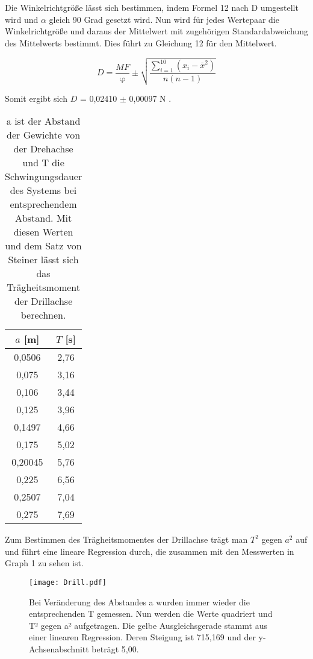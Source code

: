 \documentclass[titlepage = firstcover]{scrartcl}
\begin{document}
      Die Winkelrichtgröße lässt sich bestimmen, indem Formel 12 nach D umgestellt wird und $\alpha$ gleich 90 Grad gesetzt wird. Nun wird für jedes Wertepaar die
      Winkelrichtgröße und daraus der Mittelwert mit zugehörigen Standardabweichung des Mittelwerts bestimmt. Dies führt zu Gleichung 12 für den Mittelwert.

      \begin{equation}
        D = \frac{MF}{\upvarphi} \pm \sqrt{\frac{\sum_{i=1}^{10}(x_i - \overline{x}^2)}{n(n-1)}}   
      \end{equation}

      Somit ergibt sich $D$ = 0,02410 $\pm$ 0,00097 N .
      \newpage
      \begin{table}[h]
        \centering
        \caption{a ist der Abstand der Gewichte von der Drehachse und T die Schwingungsdauer des Systems bei entsprechendem Abstand. Mit diesen Werten und dem Satz von Steiner lässt sich das Trägheitsmoment der Drillachse berechnen.}
        \label{tab:Tabelle_2}
        
        \begin{tabular}{c c}
          \toprule
          {$a$ [m]} & {$T$ [s]} \\
          \midrule
          0,0506 & 2,76 \\
          0,075 & 3,16 \\
          0,106 & 3,44 \\
          0,125 & 3,96 \\
          0,1497 & 4,66 \\
          0,175 & 5,02 \\
          0,20045 & 5,76 \\
          0,225 & 6,56 \\
          0,2507 & 7,04 \\
          0,275 & 7,69 \\
          \bottomrule
        \end{tabular}
      \end{table}
      
      Zum Bestimmen des Trägheitsmomentes der Drillachse trägt man $T^2$ gegen $a^2$ auf und führt eine lineare Regression durch, die zusammen mit den Messwerten
      in Graph 1 zu sehen ist.
      \begin{figure}[h]
        \centering
        \texttt{[image: Drill.pdf]}
        \caption{Bei Veränderung des Abstandes a wurden immer wieder die entsprechenden T gemessen. Nun werden die Werte quadriert und T² gegen a² aufgetragen. Die gelbe Ausgleichsgerade stammt aus einer linearen Regression. Deren Steigung ist 715,169 und der y-Achsenabschnitt beträgt 5,00.}
      \end{figure}
      
\end{document}
